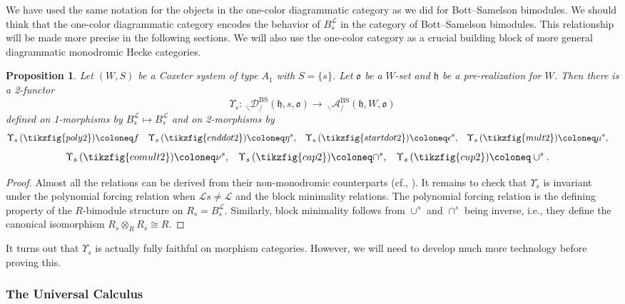 \documentclass{amsart}
\newcommand{\scrL}{\mathcal{L}}
\newcommand{\fr}[1]{\mathfrak{#1}}
\DeclareMathOperator{\BS}{BS}
\newcommand{\EWmon}[2]{\:_{#1 \backslash} \mathcal{D}_{/ #2} }
\newcommand{\Amon}[2]{\:_{#1 \backslash} \mathcal{A}_{/ #2} }
\newtheorem{proposition}[subsubsection]{Proposition}
\theoremstyle{definition}
\numberwithin{equation}{subsection}
\begin{document}
We have used the same notation for the objects in the one-color diagrammatic category as we did for Bott--Samelson bimodules. 
We should think that the one-color diagrammatic category encodes the behavior of $B_s^{\scrL}$ in the category of Bott--Samelson bimodules.
This relationship will be made more precise in the following sections.
We will also use the one-color category as a crucial building block of more general diagrammatic monodromic Hecke categories.

\begin{proposition}\label{prop:one_color_soergel_functor}
    Let $(W,S)$ be a Coxeter system of type $A_1$ with $S = \{s\}$. Let $\fr{o}$ be a $W$-set and $\fr{h}$ be a pre-realization for $W$.
    Then there is a 2-functor
    \[\Upsilon_s : \EWmon{}{}^{\BS} (\fr{h}, s, \fr{o}) \to \Amon{}{}^{\BS} (\fr{h}, W, \fr{o}) \]
    defined on 1-morphisms by $B_s^{\scrL} \mapsto B_s^{\scrL}$ and on 2-morphisms by
    \begin{align*}
        \Upsilon_s \left( \tikzfig{poly2} \right) &\coloneq  f & \Upsilon_s \left(\tikzfig{enddot2} \right) &\coloneq \eta^s , & \Upsilon_s \left(\tikzfig{startdot2} \right) &\coloneq \epsilon^s,  & \Upsilon_s \left(\tikzfig{mult2} \right) &\coloneq  \mu^s, 
    \end{align*}
    \begin{align*}
        \Upsilon_s \left(\tikzfig{comult2} \right) &\coloneq \nu^s,  & \Upsilon_s \left(\tikzfig{cap2} \right) &\coloneq \cap^s , & \Upsilon_s \left(\tikzfig{cup2} \right) &\coloneq  \cup^s.  
    \end{align*}
\end{proposition}
\begin{proof}
    Almost all the relations can be derived from their non-monodromic counterparts (cf., \cite[Claim 5.13]{EW}).
    It remains to check that $\Upsilon_s$ is invariant under the polynomial forcing relation when $\scrL s \neq \scrL$ and the block minimality relations.
    The polynomial forcing relation is the defining property of the $R$-bimodule structure on $R_s = B_s^{\scrL}$.
    Similarly, block minimality follows from $\cup^s$ and $\cap^s$ being inverse, i.e., they define the canonical isomorphism $R_s \otimes_R R_s \cong R$.
\end{proof}

It turns out that $\Upsilon_s$ is actually fully faithful on morphism categories. However, we will need to develop much more technology before proving this.

\subsubsection{The Universal Calculus}\label{subsubsec:universal_category}
\end{document}
